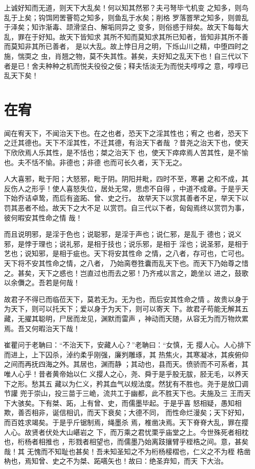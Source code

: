 \documentclass[a4paper,12pt,UTF8,twoside]{ctexbook}
\begin{document}
上诚好知而无道，则天下大乱矣！何以知其然邪？夫弓弩毕弋机变 之知多，则鸟乱于上矣；钩饵罔罟罾笱之知多，则鱼乱于水矣；削格 罗落罯罘之知多，则兽乱于泽矣；知诈渐毒、颉滑坚白、解垢同异之 变多，则俗惑于辩矣。故天下每每大乱，罪在于好知。故天下皆知求 其所不知而莫知求其所已知者，皆知非其所不善而莫知非其所已善者， 是以大乱。故上悖日月之明，下烁山川之精，中堕四时之施，惴耎之 虫，肖翘之物，莫不失其性。甚矣，夫好知之乱天下也！自三代以下 者是已！舍夫种种之机而悦夫役役之佞；释夫恬淡无为而悦夫啍啍之 意，啍啍已乱天下矣！

\section{在宥}

闻在宥天下，不闻治天下也。在之也者，恐天下之淫其性也；宥之 也者，恐天下之迁其德也。天下不淫其性，不迁其德，有治天下者哉 ？昔尧之治天下也，使天下欣欣焉人乐其性，是不恬也；桀之治天下 也，使天下瘁瘁焉人苦其性，是不愉也。夫不恬不愉。非德也；非德 也而可长久者，天下无之。

人大喜邪，毗于阳；大怒邪，毗于阴。阴阳并毗，四时不至，寒暑 之和不成，其反伤人之形乎！使人喜怒失位，居处无常，思虑不自得 ，中道不成章。于是乎天下始乔诘卓鸷，而后有盗跖、曾、史之行。 故举天下以赏其善者不足，举天下以罚其恶者不给。故天下之大不足 以赏罚。自三代以下者，匈匈焉终以赏罚为事，彼何暇安其性命之情 哉！

而且说明邪，是淫于色也；说聪邪，是淫于声也；说仁邪，是乱于 德也；说义邪，是悖于理也；说礼邪，是相于技也；说乐邪，是相于 淫也；说圣邪，是相于艺也；说知邪，是相于疵也。天下将安其性命 之情，之八者，存可也，亡可也。天下将不安其性命之情，之八者， 乃始脔卷狌囊而乱天下也。而天下乃始尊之惜 之。甚矣，天下之惑也！岂直过也而去之邪！乃齐戒以言之，跪坐以 进之，鼓歌以余儛之。吾若是何哉！

故君子不得已而临莅天下，莫若无为。无为也，而后安其性命之情 。故贵以身于为天下，则可以托天下；爱以身于为天下，则可以寄天 下。故君子苟能无解其五藏，无擢其聪明，尸居而龙见，渊默而雷声 ，神动而天随，从容无为而万物炊累焉。吾又何暇治天下哉！

崔瞿问于老聃曰：“不治天下，安藏人心？”老聃曰：“女慎，无 撄人心。人心排下而进上，上下囚杀，淖约柔乎刚强，廉刿雕琢，其 热焦火，其寒凝冰，其疾俯仰之间而再抚四海之外。其居也，渊而静 ；其动也，县而天。偾骄而不可系者，其唯人心乎！昔者黄帝始以仁 义撄人之心，尧、舜于是乎股无胈，胫无毛，以养天下之形。愁其五 藏以为仁义，矜其血气以规法度。然犹有不胜也。尧于是放囗调节讙 兜于崇山，投三苗于三峗，流共工于幽都，此不胜天下也。夫施及三 王而天下大骇矣。下有桀、跖，上有曾、史，而儒墨毕起。于是乎喜 怒相疑，愚知相欺，善否相非，诞信相讥，而天下衰矣；大德不同， 而性命烂漫矣；天下好知，而百姓求竭矣。于是乎斤锯制焉，绳墨杀 焉，椎凿决焉。天下脊脊大乱，罪在撄人心。故贤者伏处大山嵁岩之 下，而万乘之君忧栗乎庙堂之上。今世殊死者相枕也，桁杨者相推也 ，形戮者相望也，而儒墨乃始离跂攘臂乎桎梏之间。意，甚矣哉！其 无愧而不知耻也甚矣！吾未知圣知之不为桁杨椄槢也，仁义之不为桎 梏凿枘也，焉知曾、史之不为桀、跖嚆矢也！故曰：绝圣弃知，而天 下大治。
\end{document}
